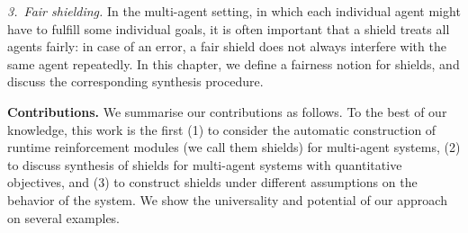 \emph{3.\ Fair shielding.}
In the multi-agent setting, in which each individual agent might have to fulfill some individual goals, it is often important that a shield treats all agents fairly:
in case of an error, a fair shield does not always interfere with the same agent repeatedly.
In this chapter, we define a fairness notion for shields, and discuss the corresponding synthesis procedure.

\textbf{Contributions.}  We summarise our contributions as follows. To the best of our knowledge, this work is the first (1) to consider the automatic construction of runtime reinforcement modules
(we call them shields) for multi-agent systems, (2) to discuss synthesis of shields for multi-agent systems with quantitative objectives,
and (3) to construct shields under different assumptions on the behavior of the system.
We show the universality and potential of our approach on several examples.

